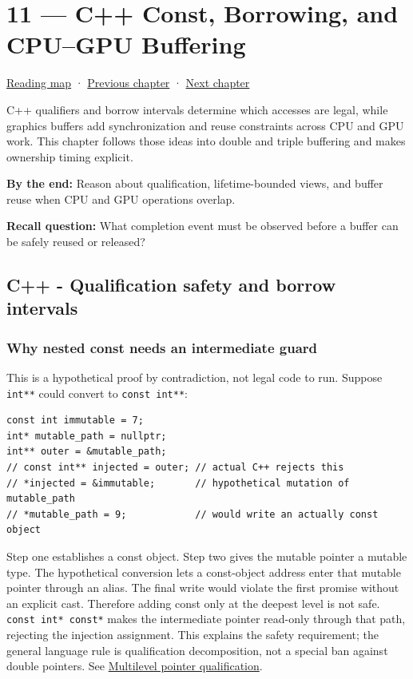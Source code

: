 \hypertarget{01-foundations-i-ch011}{}
\chapter{11 --- C++ Const, Borrowing, and CPU--GPU Buffering}\label{01-foundations-i-ch011-c-const-borrowing-and-cpugpu-buffering}

\hyperref[volume-reading-map]{Reading map} · \hyperref[01-foundations-i-ch010]{Previous chapter} · \hyperref[01-foundations-i-ch012]{Next chapter}

C++ qualifiers and borrow intervals determine which accesses are legal, while graphics buffers add synchronization and reuse constraints across CPU and GPU work. This chapter follows those ideas into double and triple buffering and makes ownership timing explicit.

\textbf{By the end:} Reason about qualification, lifetime-bounded views, and buffer reuse when CPU and GPU operations overlap.

\textbf{Recall question:} What completion event must be observed before a buffer can be safely reused or released?

\section{C++ - Qualification safety and borrow intervals}\label{01-foundations-i-ch011-c---qualification-safety-and-borrow-intervals}

\subsection{Why nested const needs an intermediate guard}\label{01-foundations-i-ch011-why-nested-const-needs-an-intermediate-guard}

This is a hypothetical proof by contradiction, not legal code to run. Suppose \texttt{int**} could convert to \texttt{const\ int**}:

\begin{verbatim}
const int immutable = 7;
int* mutable_path = nullptr;
int** outer = &mutable_path;
// const int** injected = outer; // actual C++ rejects this
// *injected = &immutable;       // hypothetical mutation of mutable_path
// *mutable_path = 9;            // would write an actually const object
\end{verbatim}

Step one establishes a const object. Step two gives the mutable pointer a mutable type. The hypothetical conversion lets a const-object address enter that mutable pointer through an alias. The final write would violate the first promise without an explicit cast. Therefore adding const only at the deepest level is not safe. \texttt{const\ int*\ const*} makes the intermediate pointer read-only through that path, rejecting the injection assignment. This explains the safety requirement; the general language rule is qualification decomposition, not a special ban against double pointers. See \hyperref[appendix-5e1a7561cd98]{Multilevel pointer qualification}.


